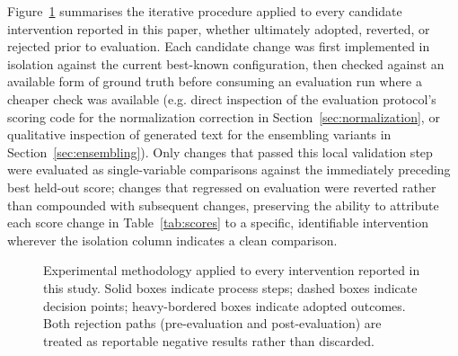 \documentclass[11pt]{article}
\begin{document}
Figure~\ref{fig:expflow} summarises the iterative procedure applied to every candidate intervention reported in this paper, whether ultimately adopted, reverted, or rejected prior to evaluation. Each candidate change was first implemented in isolation against the current best-known configuration, then checked against an available form of ground truth before consuming an evaluation run where a cheaper check was available (e.g. direct inspection of the evaluation protocol's scoring code for the normalization correction in Section~\ref{sec:normalization}, or qualitative inspection of generated text for the ensembling variants in Section~\ref{sec:ensembling}). Only changes that passed this local validation step were evaluated as single-variable comparisons against the immediately preceding best held-out score; changes that regressed on evaluation were reverted rather than compounded with subsequent changes, preserving the ability to attribute each score change in Table~\ref{tab:scores} to a specific, identifiable intervention wherever the isolation column indicates a clean comparison.

\begin{figure}[htbp]
\centering
{}
\caption{Experimental methodology applied to every intervention reported in this study. Solid boxes indicate process steps; dashed boxes indicate decision points; heavy-bordered boxes indicate adopted outcomes. Both rejection paths (pre-evaluation and post-evaluation) are treated as reportable negative results rather than discarded.}
\label{fig:expflow}
\end{figure}
\end{document}
